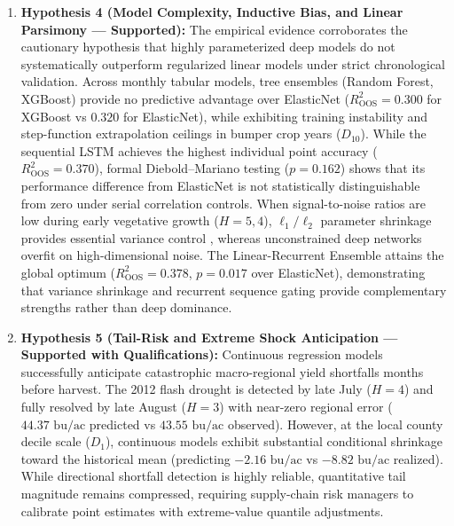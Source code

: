 \begin{enumerate}
    \item \textbf{Hypothesis 4 (Model Complexity, Inductive Bias, and Linear Parsimony --- Supported):} The empirical evidence corroborates the cautionary hypothesis that highly parameterized deep models do not systematically outperform regularized linear models under strict chronological validation. Across monthly tabular models, tree ensembles (Random Forest, XGBoost) provide no predictive advantage over ElasticNet ($R^2_{\text{OOS}} = 0.300$ for XGBoost vs $0.320$ for ElasticNet), while exhibiting training instability and step-function extrapolation ceilings in bumper crop years ($D_{10}$). While the sequential LSTM achieves the highest individual point accuracy ($R^2_{\text{OOS}} = 0.370$), formal Diebold--Mariano testing ($p=0.162$) shows that its performance difference from ElasticNet is not statistically distinguishable from zero under serial correlation controls. When signal-to-noise ratios are low during early vegetative growth ($H=5, 4$), $\ell_1/\ell_2$ parameter shrinkage provides essential variance control \citep{James2023}, whereas unconstrained deep networks overfit on high-dimensional noise. The Linear-Recurrent Ensemble attains the global optimum ($R^2_{\text{OOS}} = 0.378$, $p=0.017$ over ElasticNet), demonstrating that variance shrinkage and recurrent sequence gating provide complementary strengths rather than deep dominance.
    
    \item \textbf{Hypothesis 5 (Tail-Risk and Extreme Shock Anticipation --- Supported with Qualifications):} Continuous regression models successfully anticipate catastrophic macro-regional yield shortfalls months before harvest. The 2012 flash drought is detected by late July ($H=4$) and fully resolved by late August ($H=3$) with near-zero regional error ($44.37\text{ bu/ac}$ predicted vs $43.55\text{ bu/ac}$ observed). However, at the local county decile scale ($D_1$), continuous models exhibit substantial conditional shrinkage toward the historical mean (predicting $-2.16\text{ bu/ac}$ vs $-8.82\text{ bu/ac}$ realized). While directional shortfall detection is highly reliable, quantitative tail magnitude remains compressed, requiring supply-chain risk managers to calibrate point estimates with extreme-value quantile adjustments.
\end{enumerate}


